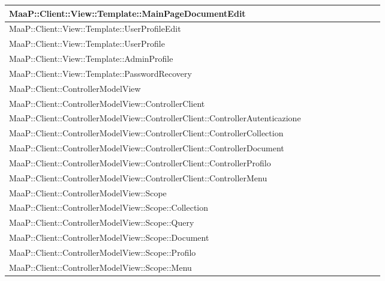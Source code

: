 \begin{center}
\begin{longtable}{|p{0.8\linewidth}|c|}
\midrule 
MaaP::Client::View::Template::MainPageDocumentEdit
& \\

\midrule 
MaaP::Client::View::Template::UserProfileEdit
& \\

\midrule 
MaaP::Client::View::Template::UserProfile
& \\

\midrule 
MaaP::Client::View::Template::AdminProfile
& \\

\midrule 
MaaP::Client::View::Template::PasswordRecovery
& \\

\midrule 
MaaP::Client::ControllerModelView
& \\

\midrule 
MaaP::Client::ControllerModelView::ControllerClient
& \\

\midrule 
MaaP::Client::ControllerModelView::ControllerClient::ControllerAutenticazione
& \\

\midrule 
MaaP::Client::ControllerModelView::ControllerClient::ControllerCollection
& \\

\midrule 
MaaP::Client::ControllerModelView::ControllerClient::ControllerDocument
& \\

\midrule 
MaaP::Client::ControllerModelView::ControllerClient::ControllerProfilo
& \\

\midrule 
MaaP::Client::ControllerModelView::ControllerClient::ControllerMenu
& \\

\midrule 
MaaP::Client::ControllerModelView::Scope
& \\

\midrule 
MaaP::Client::ControllerModelView::Scope::Collection
& \\

\midrule 
MaaP::Client::ControllerModelView::Scope::Query
& \\

\midrule 
MaaP::Client::ControllerModelView::Scope::Document
& \\

\midrule 
MaaP::Client::ControllerModelView::Scope::Profilo
& \\

\midrule 
MaaP::Client::ControllerModelView::Scope::Menu
& \\


\end{longtable}
\end{center}
